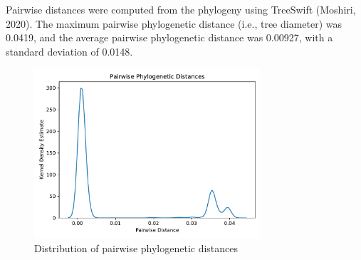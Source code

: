 \documentclass{article}
\begin{document}
Pairwise distances were computed from the phylogeny using TreeSwift (Moshiri, 2020). The maximum pairwise phylogenetic distance (i.e., tree diameter) was 0.0419, and the average pairwise phylogenetic distance was 0.00927, with a standard deviation of 0.0148.

\begin{figure}[h]
\centering
\includegraphics[width=0.75\textwidth,keepaspectratio]{./figs/pairwise_distances_tree.pdf}
\caption{Distribution of pairwise phylogenetic distances}
\end{figure}
\end{document}
